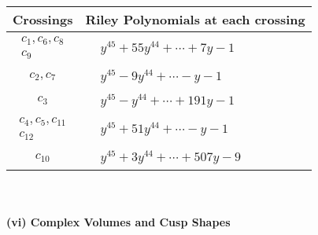 \documentclass[1p]{elsarticle_modified}
\theoremstyle{definition}
\begin{document}
\begin{tabular}{m{50pt}|m{274pt}}
Crossings & \hspace{64pt}Riley Polynomials at each crossing \\
\hline $$\begin{aligned}c_{1},c_{6},c_{8}\\c_{9}\end{aligned}$$&$\begin{aligned}
&y^{45}+55 y^{44}+\cdots+7 y-1
\end{aligned}$\\
\hline $$\begin{aligned}c_{2},c_{7}\end{aligned}$$&$\begin{aligned}
&y^{45}-9 y^{44}+\cdots- y-1
\end{aligned}$\\
\hline $$\begin{aligned}c_{3}\end{aligned}$$&$\begin{aligned}
&y^{45}- y^{44}+\cdots+191 y-1
\end{aligned}$\\
\hline $$\begin{aligned}c_{4},c_{5},c_{11}\\c_{12}\end{aligned}$$&$\begin{aligned}
&y^{45}+51 y^{44}+\cdots- y-1
\end{aligned}$\\
\hline $$\begin{aligned}c_{10}\end{aligned}$$&$\begin{aligned}
&y^{45}+3 y^{44}+\cdots+507 y-9
\end{aligned}$\\
\hline
\end{tabular}\\~\\
\newpage\flushleft \textbf{(vi) Complex Volumes and Cusp Shapes}
\end{document}
